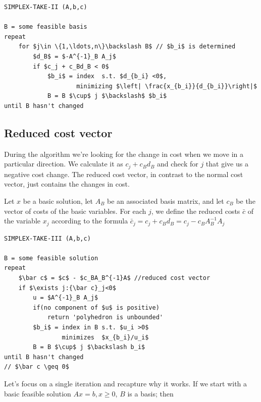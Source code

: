 \begin{center}
\begin{lstlisting}
SIMPLEX-TAKE-II (A,b,c)

B = some feasible basis
repeat 
    for $j\in \{1,\ldots,n\}\backslash B$ // $b_i$ is determined
        $d_B$ = $-A^{-1}_B A_j$
        if $c_j + c_Bd_B < 0$
            $b_i$ = index  s.t. $d_{b_i} <0$, 
                    minimizing $\left| \frac{x_{b_i}}{d_{b_i}}\right|$
            B = B $\cup$ j $\backslash$ $b_i$
until B hasn't changed
\end{lstlisting}
\end{center}

\subsection{Reduced cost vector}
During the algorithm we're looking for the change in cost when we move in a particular direction. We calculate it as $c_j+c_Bd_B$ and check for $j$ that give us a negative cost change. The reduced cost vector, in contrast to the normal cost vector, just contains the changes in cost.

\begin{Def}
 Let $x$ be a basic solution, let $A_B$ be an associated basis matrix, and let $c_B$ be the vector of costs of the basic variables. For each $j$, we define the reduced costs $\bar c$ of the variable $x_j$ according to the formula 
$\bar c_j = c_j + c_Bd_B = c_j - c_B A^{-1}_B A_j$
\end{Def}


\begin{center}
\begin{lstlisting}
SIMPLEX-TAKE-III (A,b,c)

B = some feasible solution
repeat
    $\bar c$ = $c$ - $c_BA_B^{-1}A$ //reduced cost vector
    if $\exists j:{\bar c}_j<0$ 
        u = $A^{-1}_B A_j$ 
        if(no component of $u$ is positive)
            return 'polyhedron is unbounded'
        $b_i$ = index in B s.t. $u_i >0$ 
                minimizes  $x_{b_i}/u_i$
        B = B $\cup$ j $\backslash b_i$ 
until B hasn't changed 
// $\bar c \geq 0$ 
\end{lstlisting}
\end{center}


Let's focus on a single iteration and recapture why it works. If we start with a basic feasible solution $Ax=b, x\geq 0$, $B$ is a basis; then 

